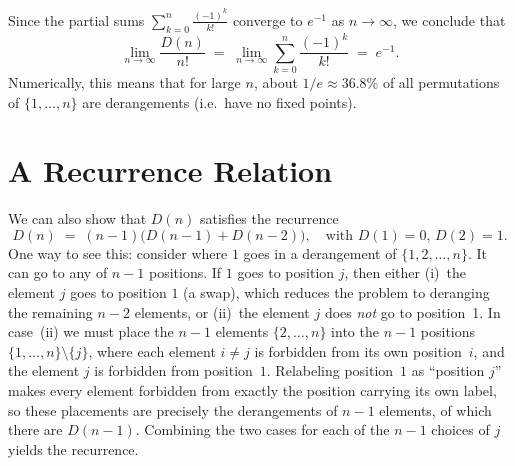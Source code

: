 \documentclass[docmute]{article}
\begin{document}
Since the partial sums \(\sum_{k=0}^{n} \frac{(-1)^k}{k!}\) converge to \(e^{-1}\) as \(n \to \infty\), we conclude that
\[
\lim_{n\to\infty} \frac{D(n)}{n!} 
\;=\; \lim_{n\to\infty} 
\sum_{k=0}^{n} \frac{(-1)^k}{k!}
\;=\;
e^{-1}.
\]
Numerically, this means that for large \(n\), about \(1/e \approx 36.8\%\) of all permutations of \(\{1,\dots,n\}\) are derangements (i.e.\ have no fixed points).


\section{A Recurrence Relation}
We can also show that $D(n)$ satisfies the recurrence
\[
D(n) \;=\; (n-1)\bigl(D(n-1) + D(n-2)\bigr),
\quad \text{with } D(1)=0, \,D(2)=1.
\]
One way to see this: consider where $1$ goes in a derangement of $\{1,2,\ldots,n\}$. It can go to any of $n-1$ positions. If $1$ goes to position $j$, then either (i)~the element $j$ goes to position $1$ (a swap), which reduces the problem to deranging the remaining $n-2$ elements, or (ii)~the element $j$ does \emph{not} go to position~1. In case~(ii) we must place the $n-1$ elements $\{2,\ldots,n\}$ into the $n-1$ positions $\{1,\ldots,n\}\setminus\{j\}$, where each element $i \neq j$ is forbidden from its own position~$i$, and the element $j$ is forbidden from position~$1$. Relabeling position~$1$ as ``position $j$'' makes every element forbidden from exactly the position carrying its own label, so these placements are precisely the derangements of $n-1$ elements, of which there are $D(n-1)$. Combining the two cases for each of the $n-1$ choices of $j$ yields the recurrence.
\end{document}
